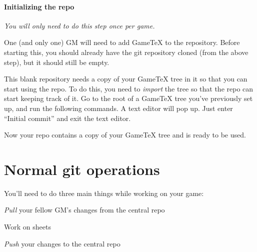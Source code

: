 \documentclass[green]{testgame}
\begin{document}
\paragraph*{Initializing the repo} \emph{You will only need to do this step once per game.}

One (and only one) GM will need to add GameTeX to the repository. Before starting this, you should already have the git repository cloned (from the above step), but it should still be empty.


This blank repository needs a copy of your GameTeX tree in it so that
you can start using the repo. To do this, you need to \emph{import} the
tree so that the repo can start keeping track of it. Go to the root of
a GameTeX tree you've previously set up, and run the following
commands. A text editor will pop up. Just enter ``Initial commit'' and
exit the text editor.


Now your repo contains a copy of your GameTeX tree and is ready to be
used.

\section{Normal git operations}

You'll need to do three main things while working on your game:
\begin{enum}[]
\item \emph{Pull} your fellow GM's changes from the central repo
\item Work on sheets
\item \emph{Push} your changes to the central repo
\end{enum}
\end{document}
